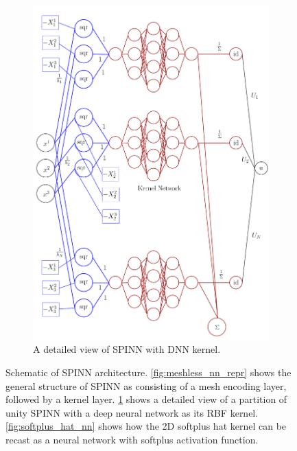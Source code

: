 \documentclass[12pt]{article}
\begin{document}
\begin{figure}[htpb]
\begin{center}
\begin{subfigure}{0.5\textwidth}
\includegraphics[width=\textwidth]{images/SPINN_detailed.pdf}
\caption{A detailed view of SPINN with DNN kernel.}
\label{fig:meshless_nn_detailed}
\end{subfigure}
\end{center}
\caption{Schematic of SPINN architecture. \ref{fig:meshless_nn_repr} shows the general structure of SPINN as consisting of a mesh encoding layer, followed by a kernel layer. \ref{fig:meshless_nn_detailed} shows a detailed view of a partition of unity SPINN with a deep neural network as its RBF kernel. \ref{fig:softplus_hat_nn} shows how the 2D softplus hat kernel can be recast as a neural network with softplus activation function.}
\label{fig:spinn_architecture}
\end{figure}
\end{document}

